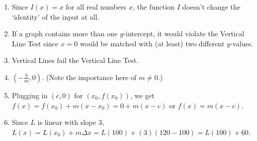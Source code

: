 \begin{enumerate}
\setcounter{enumi}{\value{HW}}

\item  Since $I(x) = x$ for all real numbers $x$, the function $I$ doesn't change the `identity' of the input at all.   


\item If a graph contains more than one $y$-intercept, it would violate the Vertical Line Test since $x=0$ would be matched with (at least) two different $y$-values.

\item  Vertical Lines fail the Vertical Line Test.

\item  $\left(- \frac{b}{m}, 0 \right)$.  (Note the importance here of $m \neq 0$.)

\item Plugging in $(c,0)$ for $(x_{0}, f(x_{0}))$, we get $f(x) = f(x_{0}) + m (x - x_{0}) = 0 + m(x-c)$ or $f(x) = m(x-c)$.

\item Since $L$ is linear with slope $3$, $L(x) = L(x_{0}) + m \Delta x = L(100) + (3)(120-100) = L(100)+60$.

\setcounter{HW}{\value{enumi}}
\end{enumerate}


